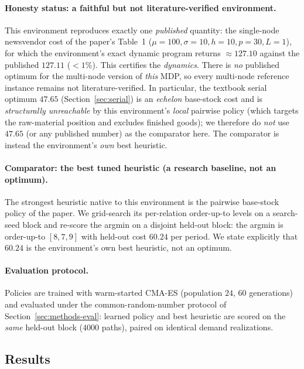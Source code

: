 \documentclass[11pt]{article}
\begin{document}
\paragraph{Honesty status: a faithful but not literature-verified environment.}
This environment reproduces exactly one \emph{published} quantity: the single-node newsvendor cost of
the paper's Table~1 ($\mu=100,\sigma=10,h=10,p=30,L=1$), for which the environment's exact dynamic
program returns $\approx127.10$ against the published $127.11$ ($<1\%$). This certifies the
\emph{dynamics}. There is \emph{no} published optimum for the multi-node version of \emph{this} MDP, so
every multi-node reference instance remains not literature-verified. In particular, the
textbook serial optimum $47.65$ (Section~\ref{sec:serial}) is an \emph{echelon} base-stock cost and is
\emph{structurally unreachable} by this environment's \emph{local} pairwise policy (which targets the
raw-material position and excludes finished goods); we therefore do \emph{not} use $47.65$ (or any
published number) as the comparator here. The comparator is instead the environment's \emph{own} best
heuristic.

\paragraph{Comparator: the best tuned heuristic (a research baseline, not an optimum).}
The strongest heuristic native to this environment is the pairwise base-stock policy of the paper. We
grid-search its per-relation order-up-to levels on a search-seed block and re-score the
argmin on a disjoint held-out block: the argmin is order-up-to $[8,7,9]$ with held-out cost
$60.24$ per period. We state explicitly that $60.24$ is the environment's own best heuristic, not an
optimum.

\paragraph{Evaluation protocol.}
Policies are trained with warm-started CMA-ES (population $24$, $60$ generations) and evaluated under
the common-random-number protocol of Section~\ref{sec:methods-eval}: learned policy and best heuristic are scored
on the \emph{same} held-out block ($4000$ paths), paired on identical demand realizations.

\subsection{Results}
\label{sec:pirhoo-results}
\end{document}
